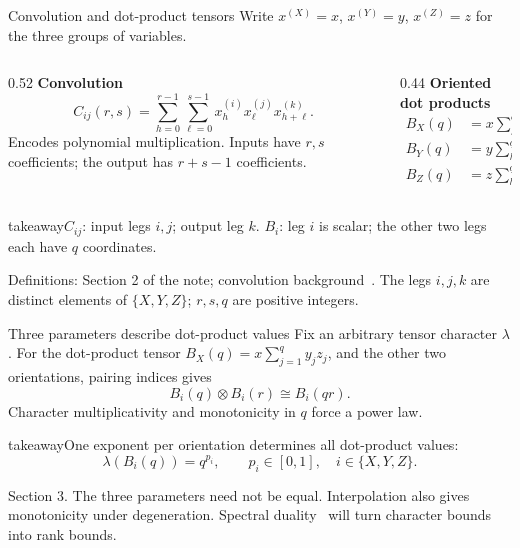 \documentclass[aspectratio=169,11pt]{beamer}
\newcommand{\source}[1]{\vfill\par{\fontsize{7.5}{9}\selectfont\color{muted}#1\par}}
\newcommand{\takeaway}[1]{\begin{beamercolorbox}[sep=0.65em,wd=\linewidth]{takeaway}#1\end{beamercolorbox}}
\begin{document}
\begin{frame}{Convolution and dot-product tensors}
  Write $x^{(X)}=x$, $x^{(Y)}=y$, $x^{(Z)}=z$ for the three groups of variables.
  \par\medskip
  \begin{columns}[T,onlytextwidth]
    \begin{column}{0.52\textwidth}
      \textbf{Convolution}
      \[
        C_{ij}(r,s)=\sum_{h=0}^{r-1}\sum_{\ell=0}^{s-1}
        x_h^{(i)}x_\ell^{(j)}x_{h+\ell}^{(k)}.
      \]
      Encodes polynomial multiplication. Inputs have $r,s$ coefficients;
      the output has $r+s-1$ coefficients.
    \end{column}
    \begin{column}{0.44\textwidth}
      \textbf{Oriented dot products}
      \[
      \begin{aligned}
        B_X(q)&=x\sum_{h=1}^{q}y_hz_h,\\
        B_Y(q)&=y\sum_{h=1}^{q}x_hz_h,\\
        B_Z(q)&=z\sum_{h=1}^{q}x_hy_h.
      \end{aligned}
      \]
    \end{column}
  \end{columns}
  \medskip
  \takeaway{$C_{ij}$: input legs $i,j$; output leg $k$.\newline
    $B_i$: leg $i$ is scalar; the other two legs each have $q$ coordinates.}
  \source{Definitions: Section 2 of the note; convolution background~\cite{convolution}.
  The legs $i,j,k$ are distinct elements of $\{X,Y,Z\}$;
  $r,s,q$ are positive integers.}
\end{frame}

\begin{frame}{Three parameters describe dot-product values}
  Fix an arbitrary tensor character $\lambda$.
  For the dot-product tensor $B_X(q)=x\sum_{j=1}^{q}y_jz_j$,
  and the other two orientations, pairing indices gives
  \[
    B_i(q)\otimes B_i(r)\cong B_i(qr).
  \]
  Character multiplicativity and monotonicity in $q$ force a power law.
  \par\medskip
  \takeaway{One exponent per orientation determines all dot-product values:
    \[
      \lambda(B_i(q))=q^{p_i},\qquad
      p_i\in[0,1],\quad i\in\{X,Y,Z\}.
    \]}
  \source{Section 3. The three parameters need not be equal.
  Interpolation also gives monotonicity under degeneration.
  Spectral duality~\cite{strassen,spectra} will turn character bounds into rank bounds.}
\end{frame}
\end{document}

